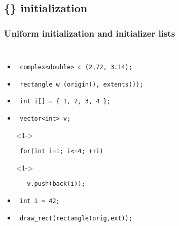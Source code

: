 \subsection{\{\} initialization} \lyxframeend{}

\begin{frame}[fragile]
\frametitle{Uniform initialization and initializer lists}

\begin{columns}[t]
\begin{itemize}
\item<1->{\scriptsize\begin{verbatim} complex<double> c (2,72, 3.14); \end{verbatim}}
\item<1->{\scriptsize\begin{verbatim} rectangle w (origin(), extents());\end{verbatim}}


\item<1->{\scriptsize\begin{verbatim} int i[] = { 1, 2, 3, 4 };  \end{verbatim}}
\item<1->{\scriptsize\begin{verbatim} vector<int> v;  \end{verbatim}}
\item[]<1->{\scriptsize\begin{verbatim} for(int i=1; i<=4; ++i)   \end{verbatim}}
\item[]<1->{\scriptsize\begin{verbatim}   v.push(back(i)); \end{verbatim}}
\item<3->{\scriptsize\begin{verbatim} int i = 42;  \end{verbatim}}
\item<4->{\scriptsize\begin{verbatim} draw_rect(rectangle(orig,ext));  \end{verbatim}}
\end{itemize}


\end{columns}
\end{frame}
